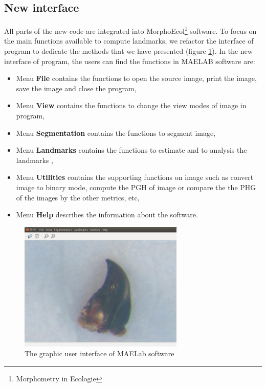\subsection{New interface}
All parts of the new code are integrated into MorphoEcol\footnote{Morphometry in Ecologie} software. To focus on the main functions available to compute landmarks, we refactor the interface of program to dedicate the methods that we have presented (figure \ref{fig:44}).
In the new interface of program, the users can find the functions in MAELAB software are:
\begin{itemize}
\item Menu \textbf{File} contains the functions to open the source image, print the image, save the image and close the program,
\item Menu \textbf{View} contains the functions to change the view modes of image in program,
\item Menu \textbf{Segmentation} contains the functions to segment image,
\item Menu \textbf{Landmarks} contains the functions to estimate and to analysis the landmarks ,
\item Menu \textbf{Utilities} contains the supporting functions on image such as convert image to binary mode, compute the PGH of image or compare the the PHG of the images by the other metrics, etc,
\item Menu \textbf{Help} describes the information about the software.
\end{itemize}
\begin{figure}[h!]
\centering
\includegraphics[width=0.7\textwidth]{./images/software}
\caption{The graphic user interface of MAELab software}
\label{fig:44}
\end{figure}
\iffalse
